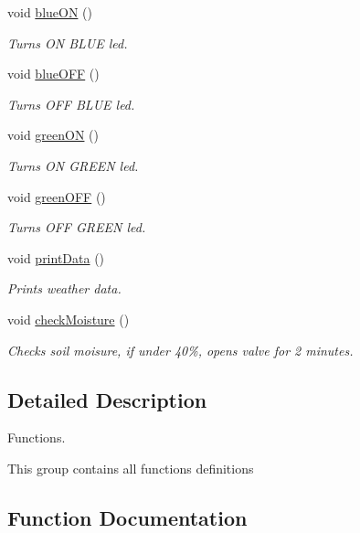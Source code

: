 \begin{DoxyCompactItemize}
void \hyperlink{group__fn_ga04998af0bfe99c448390ce61f68e10aa}{blue\+ON} ()
\begin{DoxyCompactList}\small\item\em Turns ON B\+L\+UE led. \end{DoxyCompactList}\item 
void \hyperlink{group__fn_gadaf50e66c08aabcc0fe574c3815d382d}{blue\+O\+FF} ()
\begin{DoxyCompactList}\small\item\em Turns O\+FF B\+L\+UE led. \end{DoxyCompactList}\item 
void \hyperlink{group__fn_ga7145f6eb0ee4f9c64cd130b5092b28ce}{green\+ON} ()
\begin{DoxyCompactList}\small\item\em Turns ON G\+R\+E\+EN led. \end{DoxyCompactList}\item 
void \hyperlink{group__fn_ga1cb0a5ea076eb54f559513f85b9d0ac7}{green\+O\+FF} ()
\begin{DoxyCompactList}\small\item\em Turns O\+FF G\+R\+E\+EN led. \end{DoxyCompactList}\item 
void \hyperlink{group__fn_ga8990c590daf1e654be6a544107bed3a1}{print\+Data} ()
\begin{DoxyCompactList}\small\item\em Prints weather data. \end{DoxyCompactList}\item 
void \hyperlink{group__fn_ga81f4a232058fafad13d2ab368b8db7db}{check\+Moisture} ()
\begin{DoxyCompactList}\small\item\em Checks soil moisure, if under 40\%, opens valve for 2 minutes. \end{DoxyCompactList}\end{DoxyCompactItemize}


\subsection{Detailed Description}
Functions. 

This group contains all functions definitions 

\subsection{Function Documentation}
